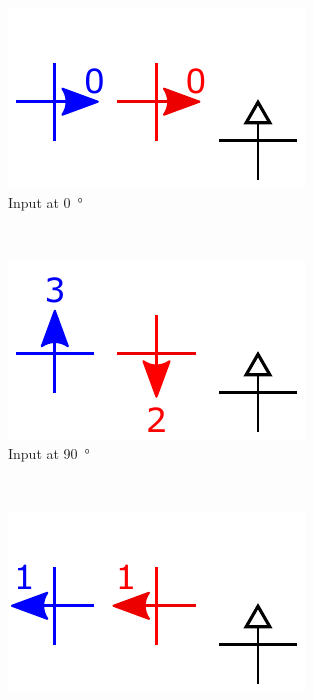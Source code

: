 \documentclass[11pt,a4paper,english]{article}
\newcommand{\rulesep}{\unskip\ \vrule\ }
\begin{document}
\begin{figure}
    \centering
    \begin{subfigure}[t]{0.23\textwidth}
        \includegraphics[width=\textwidth]{Figures/half_adder/schematic/000006side_inputs_In1_0312/Input 0 deg arrowtext.pdf}
        \caption{Input at \SI{0}{\degree}}
    \end{subfigure}
    \rulesep
    \begin{subfigure}[t]{0.23\textwidth}
        \includegraphics[width=\textwidth]{Figures/half_adder/schematic/000006side_inputs_In1_0312/Input 90 deg arrowtext.pdf}
        \caption{Input at \SI{90}{\degree}}
    \end{subfigure}
    \rulesep
    \begin{subfigure}[t]{0.23\textwidth}
        \includegraphics[width=\textwidth]{Figures/half_adder/schematic/000006side_inputs_In1_0312/Input 180 deg arrowtext.pdf}

\end{subfigure}
\end{figure}
\end{document}

